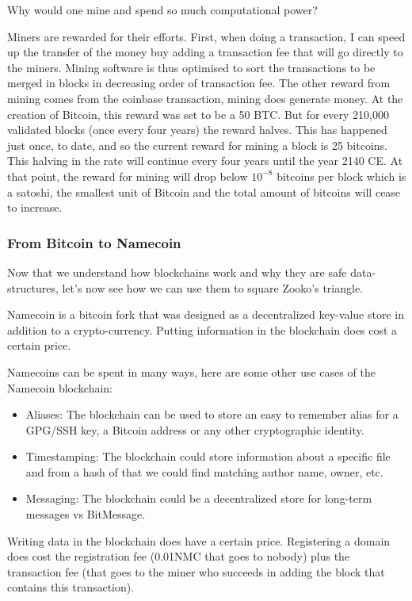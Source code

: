 \documentclass{vldb}
\begin{document}
Why would one mine and spend so much computational power?


Miners are rewarded for their efforts. First, when doing a transaction, I can speed up the transfer of the money buy adding a transaction fee that will go directly to the miners. Mining software is thus optimised to sort the transactions to be merged in blocks in decreasing order of transaction fee. 
The other reward from mining comes from the coinbase transaction, mining does generate money.  At the creation of Bitcoin, this reward was set to be a 50 BTC. But for every 210,000 validated blocks (once every four years) the reward halves. This has happened just once, to date, and so the current reward for mining a block is 25 bitcoins. This halving in the rate will continue every four years until the year 2140 CE. At that point, the reward for mining will drop below $10^{-8}$ bitcoins per block which is a satoshi, the smallest unit of Bitcoin and the total amount of bitcoins will cease to increase.

\subsubsection{From Bitcoin to Namecoin}

Now that we understand how blockchains work and why they are safe data-structures, let's now see how we can use them to square Zooko's triangle. 

Namecoin is a bitcoin fork that was designed as a decentralized key-value store in addition to a crypto-currency. Putting information in the blockchain does cost a certain price.

Namecoins can be spent in many ways, here are some other use cases of the Namecoin blockchain:
\begin{itemize}
\item Aliases: The blockchain can be used to store an easy to remember alias for a GPG/SSH key, a Bitcoin address or any other cryptographic identity.
\item Timestamping: The blockchain could store information about a specific file and from a hash of that we could find matching author name, owner, etc.
\item Messaging: The blockchain could be a decentralized store for  long-term messages vs BitMessage.
\end{itemize}

Writing data in the blockchain does have a certain price. Registering a domain does cost the registration fee (0.01NMC that goes to nobody) plus the transaction fee (that goes to the miner who succeeds in adding the block that contains this transaction).
\end{document}
